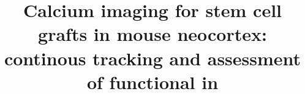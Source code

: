 \title{Calcium imaging for stem cell grafts in mouse neocortex: continous tracking and assessment of functional in}